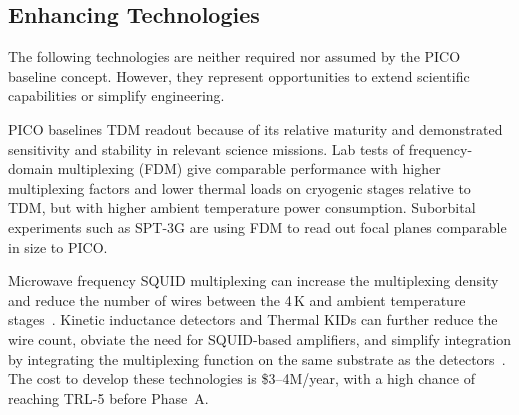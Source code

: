 
\subsection{Enhancing Technologies}
\label{sec:enhancing_technologies} %

The following technologies are neither required nor assumed by the PICO baseline concept. However, they represent opportunities to extend scientific capabilities or simplify engineering.

PICO baselines TDM readout because of its relative maturity and demonstrated sensitivity and stability in relevant science missions. Lab tests of frequency-domain multiplexing (FDM) give comparable performance with higher multiplexing factors and lower thermal loads on cryogenic stages relative to TDM, but with higher ambient temperature power consumption. Suborbital experiments such as SPT-3G are using FDM to read out focal planes comparable in size to PICO.

Microwave frequency SQUID multiplexing can increase the multiplexing density and reduce the number of wires between the 4\,K and ambient temperature stages~\citep{Dober2017,Irwin2004}. Kinetic inductance detectors and Thermal KIDs can further reduce the wire count, obviate the need for SQUID-based amplifiers, and simplify integration by integrating the multiplexing function on the same substrate as the detectors~\citep{McCarrick2018,Steinbach2018,Johnson2018}. The cost to develop these technologies is \$3--4M/year, with a high chance of reaching TRL-5 before Phase~A.

